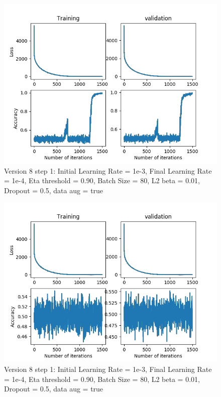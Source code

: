 \documentclass[12pt,reqno]{amsart}
\numberwithin{equation}{section}
\begin{document}
\begin{enumerate}
\begin{figure}[H]
\centering
\includegraphics[scale=0.6]{data_liquid25_version9_step1}
\caption{Version 8 step 1: Initial Learning Rate = 1e-3, Final Learning Rate = 1e-4, Eta threshold = 0.90, Batch Size = 80, L2 beta = 0.01, Dropout = 0.5, data aug = true}
\end{figure}

\begin{figure}[H]
\centering
\includegraphics[scale=0.6]{data_liquid25_version10_step1}
\caption{Version 8 step 1: Initial Learning Rate = 1e-3, Final Learning Rate = 1e-4, Eta threshold = 0.90, Batch Size = 80, L2 beta = 0.01, Dropout = 0.5, data aug = true}
\end{figure}


\end{enumerate}
\end{document}
